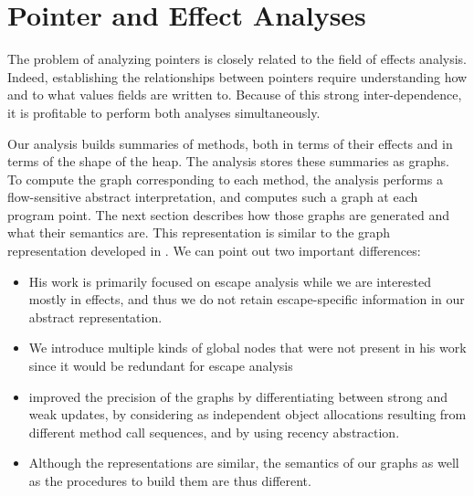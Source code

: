 \chapter{Pointer and Effect Analyses}
\label{chap:pointer}
The problem of analyzing pointers is closely related to the field of effects
analysis. Indeed, establishing the relationships between pointers require
understanding how and to what values fields are written to. Because of this
strong inter-dependence, it is profitable to perform both analyses simultaneously.


Our analysis builds summaries of methods, both in terms of their effects and in
terms of the shape of the heap. The analysis stores these summaries as graphs.
To compute the graph corresponding to each method, the analysis performs a
flow-sensitive abstract interpretation, and computes such a graph at each
program point. The next section describes how those graphs are generated and
what their semantics are. This representation is similar to
the graph representation developed in \cite{Salcianu2006}. We can
point out two important differences:
\begin{itemize}
    \item His work is primarily focused on
escape analysis while we are interested mostly in effects, and thus we do not retain escape-specific information
in our abstract representation.
    \item We introduce multiple kinds of global
nodes that were not present in his work since it would be redundant for escape
analysis
    \item improved the precision of the graphs by differentiating
between strong and weak updates, by considering as independent object
allocations resulting from different method call sequences, and by using
recency abstraction.
    \item Although the representations are similar, the semantics of
our graphs as well as the procedures to build them are thus different.
\end{itemize}


